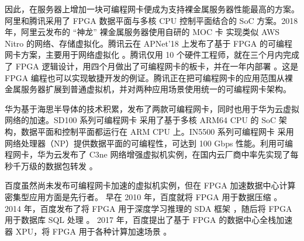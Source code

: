 因此，在服务器上增加一块可编程网卡便成为支持裸金属服务器性能最高的方案。阿里和腾讯采用了 FPGA 数据平面与多核 CPU 控制平面结合的 SoC 方案。2018 年，阿里云发布的 ``神龙'' 裸金属服务器使用自研的 MOC 卡 \cite{alicloud-smartnic,alicloud-xdragon} 实现类似 AWS Nitro 的网络、存储虚拟化。腾讯云在 APNet’18 上发布了基于 FPGA 的可编程网卡方案，主要用于网络虚拟化 \cite{tencent-smartnic}。腾讯仅用 10 个硬件工程师，就在三个月内完成了 FPGA 逻辑设计，用四个月做出了可编程网卡的板卡，并在一年内部署 \cite{tencent-smartnic}。这是 FPGA 编程也可以实现敏捷开发的例证。腾讯正在把可编程网卡的应用范围从裸金属服务器扩展到普通虚拟机，并对两种应用场景使用统一的可编程网卡架构。

华为基于海思半导体的技术积累，发布了两款可编程网卡，同时也用于华为云虚拟网络的加速。SD100 系列可编程网卡 \cite{sd100} 采用了基于多核 ARM64 CPU 的 SoC 架构，数据平面和控制平面都运行在 ARM CPU 上。IN5500 系列可编程网卡 \cite{in200} 采用网络处理器（NP）提供数据平面的可编程性，可达到 100 Gbps 性能。利用可编程网卡，华为云发布了 C3ne 网络增强虚拟机实例，在国内云厂商中率先实现了每秒千万级的数据包转发 \cite{huawei-smartnic}。

百度虽然尚未发布可编程网卡加速的虚拟机实例，但在 FPGA 加速数据中心计算密集型应用方面是先行者。
早在 2010 年，百度就将 FPGA 用于数据压缩 \cite{ouyang2010fpga}。
2014 年，百度发布了将 FPGA 用于深度学习推理的 SDA 框架 \cite{ouyang2014sda}，随后将 FPGA 用于数据库 SQL 处理 \cite{baidu-fpga-sql}。
2017 年，百度提出了基于 FPGA 的数据中心全栈加速器 XPU，将 FPGA 用于各种计算加速场景 \cite{ouyang2017xpu}。